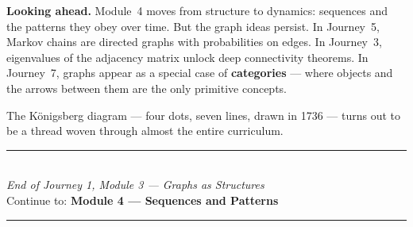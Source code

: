 \documentclass[12pt, a4paper]{article}
\begin{document}
\medskip
\noindent\textbf{Looking ahead.}
Module~4 moves from structure to dynamics: sequences and the patterns they obey over time. But the graph ideas persist. In Journey~5, Markov chains are directed graphs with probabilities on edges. In Journey~3, eigenvalues of the adjacency matrix unlock deep connectivity theorems. In Journey~7, graphs appear as a special case of \textbf{categories} --- where objects and the arrows between them are the only primitive concepts.

\medskip
The K\"{o}nigsberg diagram --- four dots, seven lines, drawn in 1736 --- turns out to be a thread woven through almost the entire curriculum.

\vspace{1.4cm}
\begin{center}
{\color{MidBlue}\rule{0.5\linewidth}{0.8pt}}\\[6pt]
{\small\color{DarkGrey}\textit{End of Journey 1, Module 3 --- Graphs as Structures}}\\[4pt]
{\small\color{DarkGrey}Continue to: \textbf{Module 4 --- Sequences and Patterns}}\\[6pt]
{\color{MidBlue}\rule{0.5\linewidth}{0.8pt}}
\end{center}
\end{document}
